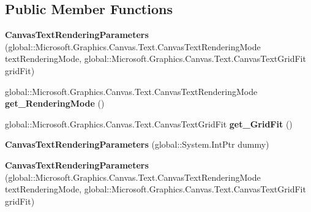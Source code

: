 \subsection*{Public Member Functions}
\begin{DoxyCompactItemize}
\item 
\mbox{\label{class_microsoft_1_1_graphics_1_1_canvas_1_1_text_1_1_canvas_text_rendering_parameters_a8bc601f6cb5eb616c046828f90971b95}} 
{\bfseries Canvas\+Text\+Rendering\+Parameters} (global\+::\+Microsoft.\+Graphics.\+Canvas.\+Text.\+Canvas\+Text\+Rendering\+Mode text\+Rendering\+Mode, global\+::\+Microsoft.\+Graphics.\+Canvas.\+Text.\+Canvas\+Text\+Grid\+Fit grid\+Fit)
\item 
\mbox{\label{class_microsoft_1_1_graphics_1_1_canvas_1_1_text_1_1_canvas_text_rendering_parameters_ac81e7f0df5d66bcb7ea9834f1b82dbfe}} 
global\+::\+Microsoft.\+Graphics.\+Canvas.\+Text.\+Canvas\+Text\+Rendering\+Mode {\bfseries get\+\_\+\+Rendering\+Mode} ()
\item 
\mbox{\label{class_microsoft_1_1_graphics_1_1_canvas_1_1_text_1_1_canvas_text_rendering_parameters_aa1458117209938acb439e48a1b9840d1}} 
global\+::\+Microsoft.\+Graphics.\+Canvas.\+Text.\+Canvas\+Text\+Grid\+Fit {\bfseries get\+\_\+\+Grid\+Fit} ()
\item 
\mbox{\label{class_microsoft_1_1_graphics_1_1_canvas_1_1_text_1_1_canvas_text_rendering_parameters_a808dd2cd44ae8871c788d0f285abb379}} 
{\bfseries Canvas\+Text\+Rendering\+Parameters} (global\+::\+System.\+Int\+Ptr dummy)
\item 
\mbox{\label{class_microsoft_1_1_graphics_1_1_canvas_1_1_text_1_1_canvas_text_rendering_parameters_a8bc601f6cb5eb616c046828f90971b95}} 
{\bfseries Canvas\+Text\+Rendering\+Parameters} (global\+::\+Microsoft.\+Graphics.\+Canvas.\+Text.\+Canvas\+Text\+Rendering\+Mode text\+Rendering\+Mode, global\+::\+Microsoft.\+Graphics.\+Canvas.\+Text.\+Canvas\+Text\+Grid\+Fit grid\+Fit)

\end{DoxyCompactItemize}
